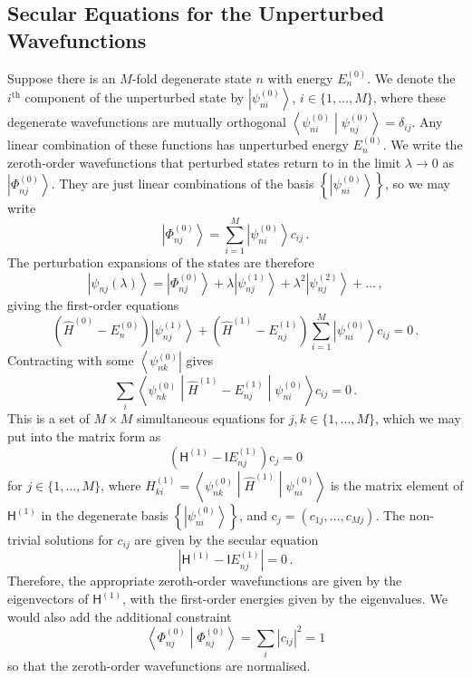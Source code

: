 \documentclass{article}
\theoremstyle{plain}\theoremheaderfont{\normalfont\itshape}\theorembodyfont{\rmfamily}\theoremseparator{.}\newtheorem*{rem}{Remark}\newtheorem*{ex}{Example}\newtheorem*{proof}{Proof}\newtheorem*{altp}{Alternative proof}
\theoremstyle{plain}\theoremheaderfont{\normalfont\bfseries}\theorembodyfont{\rmfamily}\theoremseparator{.}\newtheorem{thm}{Theorem}[section]\newtheorem{lem}[thm]{Lemma}\newtheorem{prop}[thm]{Proposition}\newtheorem*{cor}{Corollary}\newtheorem{defn}[thm]{Definition}\newtheorem{clm}[thm]{Claim}\newtheorem{clminproof}{Claim}
\theoremstyle{break}\theoremheaderfont{\normalfont\itshape}\theorembodyfont{\rmfamily}\theoremseparator{.\medskip}\newtheorem*{proofskip}{Proof}\newtheorem*{exs}{Examples}\newtheorem*{rems}{Remarks}
\theoremstyle{break}\theoremheaderfont{\normalfont\bfseries}\theorembodyfont{\rmfamily}\theoremseparator{.\medskip}\newtheorem{lemskip}[thm]{Lemma}\newtheorem{defnskip}[thm]{Definition}\newtheorem{propskip}[thm]{Proposition}\newtheorem{thmskip}[thm]{Theorem}
\numberwithin{equation}{section}
\newcommand{\bra}[1]{\left\langle #1 \right|}
\newcommand{\ket}[1]{\left| #1 \right\rangle}
\newcommand{\braket}[2]{\left\langle #1 \middle| #2 \right\rangle}
\newcommand{\mel}[3]{\left\langle #1 \middle| #2 \middle| #3 \right\rangle}
\newcommand{\vb}[1]{\bm{\mathrm{#1}}}
\newcommand{\abs}[1]{\left| #1 \right|}
\begin{document}
    \subsection{Secular Equations for the Unperturbed Wavefunctions}
    Suppose there is an \(M\)-fold degenerate state \(n\) with energy \(E_n^{(0)}\). We denote the \(i^{\text{th}}\) component of the unperturbed state by \(\ket{\psi_{ni}^{(0)}}\), \(i\in\{1,\dots,M\}\), where these degenerate wavefunctions are mutually orthogonal \(\braket{\psi_{ni}^{(0)}}{\psi_{nj}^{(0)}}=\delta_{ij}\). Any linear combination of these functions has unperturbed energy \(E_n^{(0)}\). We write the zeroth-order wavefunctions that perturbed states return to in the limit \(\lambda\to 0\) as \(\ket{\Phi_{nj}^{(0)}}\). They are just linear combinations of the basis \(\left\{\ket{\psi_{ni}^{(0)}}\right\}\), so we may write
    \begin{equation}
        \ket{\Phi_{nj}^{(0)}}=\sum_{i=1}^{M}\ket{\psi_{ni}^{(0)}}c_{ij}\,.
    \end{equation}
    The perturbation expansions of the states are therefore
    \begin{equation}
        \ket{\psi_{nj}(\lambda)}=\ket{\Phi_{nj}^{(0)}}+\lambda\ket{\psi_{nj}^{(1)}}+\lambda^2\ket{\psi_{nj}^{(2)}}+\dots\,,
    \end{equation}
    giving the first-order equations
    \begin{equation}
        (\hat{H}^{(0)}-E_n^{(0)})\ket{\psi_{nj}^{(1)}}+(\hat{H}^{(1)}-E_{nj}^{(1)})\sum_{i=1}^{M}\ket{\psi_{ni}^{(0)}}c_{ij}=0\,.
    \end{equation}
    Contracting with some \(\bra{\psi_{nk}^{(0)}}\) gives
    \begin{equation}\label{degenerate_secular_equation}
        \sum_i\mel{\psi_{nk}^{(0)}}{\hat{H}^{(1)}-E_{nj}^{(1)}}{\psi_{ni}^{(0)}}c_{ij}=0\,.
    \end{equation}
    This is a set of \(M\times M\) simultaneous equations for \(j,k\in\{1,\dots,M\}\), which we may put into the matrix form as
    \begin{equation}
        (\mathsf{H}^{(1)}-\mathsf{I}E_{nj}^{(1)})\vb{c}_j=0
    \end{equation}
    for \(j\in\{1,\dots,M\}\), where \(H^{(1)}_{ki}=\mel{\psi_{nk}^{(0)}}{\hat{H}^{(1)}}{\psi_{ni}^{(0)}}\) is the matrix element of \(\mathsf{H}^{(1)}\) in the degenerate basis \(\left\{\ket{\psi_{ni}^{(0)}}\right\}\), and \(\vb{c}_j=(c_{1j},\dots,c_{Mj})\). The non-trivial solutions for \(c_{ij}\) are given by the secular equation
    \begin{equation}
        \abs{\mathsf{H}^{(1)}-\mathsf{I}E_{nj}^{(1)}}=0\,.
    \end{equation}
    Therefore, the appropriate zeroth-order wavefunctions are given by the eigenvectors of \(\mathsf{H}^{(1)}\), with the first-order energies given by the eigenvalues. We would also add the additional constraint
    \begin{equation}
        \braket{\Phi_{nj}^{(0)}}{\Phi_{nj}^{(0)}}=\sum_{i}\abs{c_{ij}}^2=1
    \end{equation}
    so that the zeroth-order wavefunctions are normalised.
\end{document}
